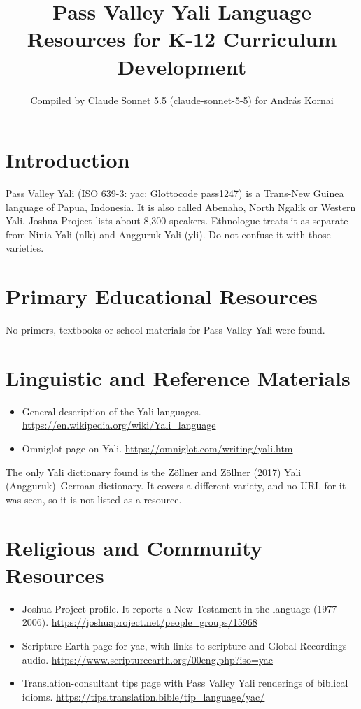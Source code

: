 \documentclass[12pt]{article}
\title{Pass Valley Yali Language Resources for K-12 Curriculum Development}
\author{Compiled by Claude Sonnet 5.5 (claude-sonnet-5-5) for Andr\'as Kornai}
\date{}
\begin{document}
\maketitle

\section{Introduction}
Pass Valley Yali (ISO 639-3: yac; Glottocode pass1247) is a Trans-New Guinea language of Papua, Indonesia. It is also called Abenaho, North Ngalik or Western Yali. Joshua Project lists about 8,300 speakers. Ethnologue treats it as separate from Ninia Yali (nlk) and Angguruk Yali (yli). Do not confuse it with those varieties.

\section{Primary Educational Resources}
No primers, textbooks or school materials for Pass Valley Yali were found.

\section{Linguistic and Reference Materials}
\begin{itemize}
\item General description of the Yali languages. \url{https://en.wikipedia.org/wiki/Yali_language}
\item Omniglot page on Yali. \url{https://omniglot.com/writing/yali.htm}
\end{itemize}
The only Yali dictionary found is the Zöllner and Zöllner (2017) Yali (Angguruk)--German dictionary. It covers a different variety, and no URL for it was seen, so it is not listed as a resource.

\section{Religious and Community Resources}
\begin{itemize}
\item Joshua Project profile. It reports a New Testament in the language (1977--2006). \url{https://joshuaproject.net/people_groups/15968}
\item Scripture Earth page for yac, with links to scripture and Global Recordings audio. \url{https://www.scriptureearth.org/00eng.php?iso=yac}
\item Translation-consultant tips page with Pass Valley Yali renderings of biblical idioms. \url{https://tips.translation.bible/tip_language/yac/}
\end{itemize}
\end{document}
